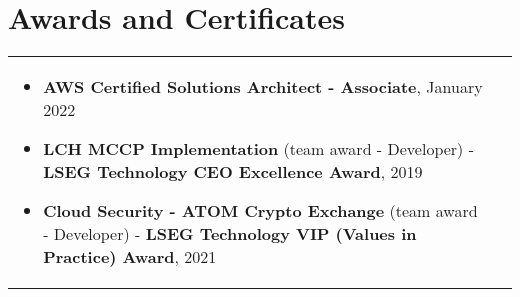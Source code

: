 \documentclass[a4paper,8pt]{article}
\begin{document}
\section{Awards and Certificates}
\begin{tabularx}{\linewidth}{ @{}l r@{} }
  \begin{minipage}[t]{\linewidth}
    \begin{itemize}[nosep,after=\strut, leftmargin=2em, itemsep=2pt]
      \item \textbf{AWS Certified Solutions Architect - Associate}, January 2022
      \item \textbf{LCH MCCP Implementation} (team award - Developer) - \textbf{LSEG Technology CEO Excellence Award}, 2019
      \item \textbf{Cloud Security - ATOM Crypto Exchange} (team award - Developer) - \textbf{LSEG Technology VIP (Values in Practice) Award}, 2021
  \end{itemize}
\end{minipage}
\end{tabularx}
\end{document}

